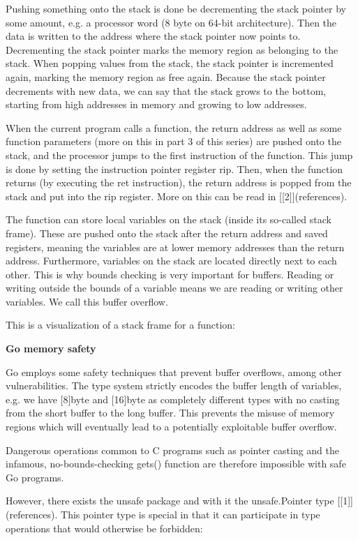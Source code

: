 Pushing something onto the stack is done be decrementing the stack pointer by some amount, e.g. a processor word (8 byte
on 64-bit architecture). Then the data is written to the address where the stack pointer now points to. Decrementing the
stack pointer marks the memory region as belonging to the stack. When popping values from the stack, the stack pointer
is incremented again, marking the memory region as free again. Because the stack pointer decrements with new data, we
can say that the stack grows to the bottom, starting from high addresses in memory and growing to low addresses.


When the current program calls a function, the return address as well as some function parameters (more on this in part
3 of this series) are pushed onto the stack, and the processor jumps to the first instruction of the function. This jump is done
by setting the instruction pointer register rip. Then, when the function returns (by executing the ret instruction),
the return address is popped from the stack and put into the rip register. More on this can be read in [[2]](references).

The function can store local variables on the stack (inside its so-called stack frame). These are pushed onto the stack
after the return address and saved registers, meaning the variables are at lower memory addresses than the return
address. Furthermore, variables on the stack are located directly next to each other. This is why bounds checking is
very important for buffers. Reading or writing outside the bounds of a variable means we are reading or writing other
variables. We call this buffer overflow.

This is a visualization of a stack frame for a function:


\textbf{Go memory safety}

Go employs some safety techniques that prevent buffer overflows, among other vulnerabilities. The type system strictly
encodes the buffer length of variables, e.g. we have [8]byte and [16]byte as completely different types with no
casting from the short buffer to the long buffer. This prevents the misuse of memory regions which will eventually lead
to a potentially exploitable buffer overflow.

Dangerous operations common to C programs such as pointer casting and the infamous, no-bounds-checking gets() function
are therefore impossible with safe Go programs.

However, there exists the unsafe package and with it the unsafe.Pointer type [[1]](references). This pointer type
is special in that it can participate in type operations that would otherwise be forbidden:

